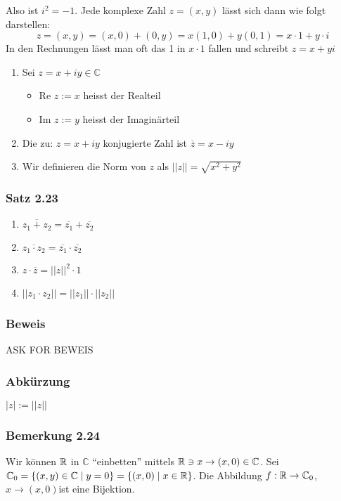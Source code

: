 Also ist $i^2=-1$. Jede komplexe Zahl $z=(x,y)$ lässt sich dann wie folgt darstellen:  \[z=(x,y)=(x,0)+(0,y)=x(1,0)+y(0,1)=x\cdot 1+ y\cdot i\]
In den Rechnungen lässt man oft das 1 in $x\cdot 1$ fallen und schreibt $z=x+yi$
\begin{definition}{2.22}
\begin{enumerate}
\item Sei $z=x+iy\in\mathbb{C}$
\begin{itemize}
\item Re $z:=x$ heisst der Realteil
\item Im $z:=y$ heisst der Imaginärteil
\end{itemize}
\item Die zu: $z=x+iy$ konjugierte Zahl ist $\overline{z}=x-iy$
\item Wir definieren die Norm von $z$ als $\left|\left| z\right|\right|=\sqrt{x^2+y^2}$
\end{enumerate}
\end{definition}
\subsubsection*{Satz 2.23}
\begin{enumerate}[\indent (i)]
\item $\overline{z_1+z_2}=\overline{z_1}+\overline{z_2}$
\item $\overline{z_1\cdot z_2}=\overline{z_1}\cdot\overline{z_2}$
\item $z\cdot\overline{z}={\left|\left| z\right|\right|}^2\cdot 1$
\item ${\left|\left| z_1\cdot z_2\right|\right|}={\left|\left| z_1\right|\right|}\cdot{\left|\left| z_2\right|\right|}$
\end{enumerate}
\subsubsection*{Beweis}
ASK FOR BEWEIS 
\subsubsection*{Abkürzung}
$\left| z\right| := \left|\left| z \right|\right|$
\subsubsection*{Bemerkung 2.24}
Wir können $\mathbb{R}$ in $\mathbb{C}$ ``einbetten'' mittels $\mathbb{R}\ni x\to (x,0)\in\mathbb{C}$. Sei $\mathbb{C}_0=\{ (x,y)\in\mathbb{C}\mid y=0 \}=\{ (x,0)\mid x\in\mathbb{R}\}$. Die Abbildung $f:\mathbb{R}\to\mathbb{C}_0$, $x\to (x,0)$ist eine Bijektion.\\

